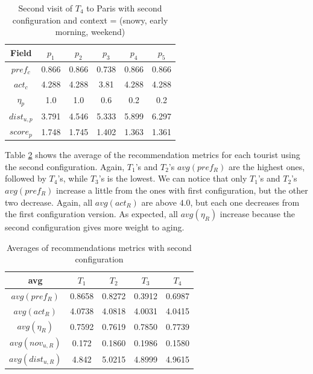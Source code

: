 \begin{table}[h!]
    \centering
        \caption{Second visit of $T_4$ to Paris with second configuration and context = (snowy,  early morning, weekend)}
    \label{table:2nd-t4-Paris-2}
    \begin{tabular}{ |c|c|c|c|c|c| } 
        \hline
        Field   & $p_1$ & $p_2$ & $p_3$ & $p_4$ & $p_5$ \\
        \hline
        $pref_c$    &  0.866 & 0.866 & 0.738 & 0.866 & 0.866 \\
        $act_c$     & 4.288 & 4.288 & 3.81 & 4.288 & 4.288  \\
        $\eta_p$    & 1.0 & 1.0 & 0.6 & 0.2 & 0.2 \\
        $dist_{u,p}$ & 3.791 & 4.546 & 5.333 & 5.899 & 6.297 \\
        $score_p$    & 1.748 & 1.745 & 1.402 & 1.363 & 1.361 \\
        
        \hline
    \end{tabular}
\end{table}

Table \ref{table:config-2} shows the average of the recommendation metrics for each tourist using the second configuration. Again, $T_1$'s and $T_2$'s $avg(pref_R)$ are the highest ones, followed by $T_4$'s, while $T_3$'s is the lowest. We can notice that only $T_1$'s and $T_2$'s $avg(pref_R)$ increase a little from the ones with first configuration, but the other two decrease. Again, all $avg(act_R)$ are above $4.0$, but each one decreases from the first configuration version. As expected, all $avg(\eta_R)$ increase because the second configuration gives more weight to aging.

\begin{table}[h!]
    \centering
    \caption{Averages of recommendations metrics with second configuration}
    \label{table:config-2}
    \begin{tabular}{ |c|c|c|c|c| } 
        \hline
        avg & $T_1$ & $T_2$ & $T_3$ & $T_4$ \\
        \hline
        \hline
        $avg(pref_R)$ & 0.8658 & 0.8272 & 0.3912 & 0.6987 \\
        $avg(act_R)$ & 4.0738 & 4.0818 & 4.0031 & 4.0415 \\
        $avg(\eta_R)$ & 0.7592 & 0.7619 & 0.7850 & 0.7739 \\
        $avg(nov_{u,R})$ & 0.172 & 0.1860 & 0.1986 & 0.1580 \\
        $avg(dist_{u,R})$ & 4.842 & 5.0215 & 4.8999 & 4.9615 \\
       
        \hline
    \end{tabular}
\end{table}

